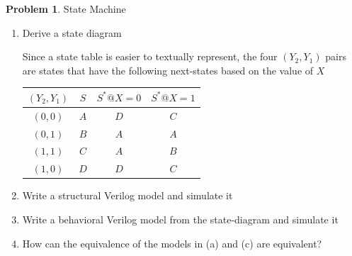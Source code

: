 \documentclass[10pt]{article}
\theoremstyle{definition}
\newtheorem{problem}{Problem}
\begin{document}
  \begin{problem}
    State Machine

    \begin{enumerate}
      \item Derive a state diagram

      Since a state table is easier to textually represent, the four $(Y_2, Y_1)$ pairs are states that have the following next-states based on the value of $X$

      \begin{center}
      \begin{tabular}{ c c | c c }
      $(Y_2, Y_1)$ & $S$ & %
      $S^* @ X = 0$ & $S^* @ X = 1$ \\
      \hline
      $(0, 0)$ & $A$ &
      $D$ & $C$ \\
      $(0, 1)$ & $B$ &
      $A$ & $A$ \\
      $(1, 1)$ & $C$ &
      $A$ & $B$ \\
      $(1, 0)$ & $D$ &
      $D$ & $C$ \\
      \end{tabular}
      \end{center}

      \item Write a structural Verilog model and simulate it
      \item Write a behavioral Verilog model from the state-diagram and simulate it
      \item How can the equivalence of the models in (a) and (c) are equivalent?
    \end{enumerate}
  \end{problem}
\end{document}
